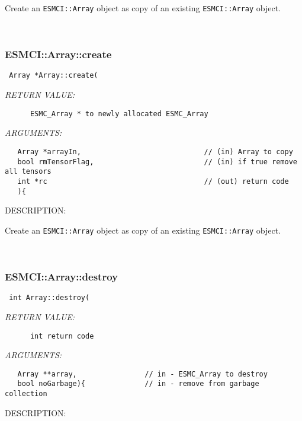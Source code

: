       Create an {\tt ESMCI::Array} object as copy of an existing
      {\tt ESMCI::Array} object. 
 
\mbox{}\hrulefill\
 
\subsubsection [ESMCI::Array::create] {ESMCI::Array::create}


  
\begin{verbatim} Array *Array::create(\end{verbatim}{\em RETURN VALUE:}
\begin{verbatim}      ESMC_Array * to newly allocated ESMC_Array\end{verbatim}{\em ARGUMENTS:}
\begin{verbatim}   Array *arrayIn,                             // (in) Array to copy
   bool rmTensorFlag,                          // (in) if true remove all tensors
   int *rc                                     // (out) return code
   ){\end{verbatim}
{\sf DESCRIPTION:\\ }


      Create an {\tt ESMCI::Array} object as copy of an existing
      {\tt ESMCI::Array} object. 
 
\mbox{}\hrulefill\
 
\subsubsection [ESMCI::Array::destroy] {ESMCI::Array::destroy}


  
\begin{verbatim} int Array::destroy(\end{verbatim}{\em RETURN VALUE:}
\begin{verbatim}      int return code\end{verbatim}{\em ARGUMENTS:}
\begin{verbatim}   Array **array,                // in - ESMC_Array to destroy
   bool noGarbage){              // in - remove from garbage collection\end{verbatim}
{\sf DESCRIPTION:\\ }


